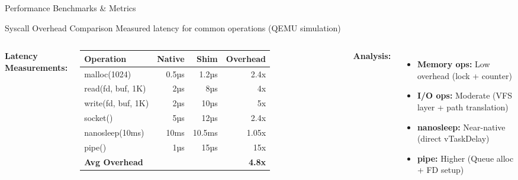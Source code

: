 \documentclass[aspectratio=169, 10pt]{beamer}
\begin{document}
\begin{frame}{Performance Benchmarks \& Metrics}
    \begin{block}{Syscall Overhead Comparison}
        Measured latency for common operations (QEMU simulation)
    \end{block}

    \vspace{0.2cm}
    \begin{columns}[T]
        \textbf{Latency Measurements:}
        \vspace{0.1cm}
        \begin{table}
            \tiny
            \begin{tabular}{@{}lrrr@{}}
                \toprule
                \textbf{Operation} & \textbf{Native} & \textbf{Shim} & \textbf{Overhead} \\
                \midrule
                malloc(1024) & 0.5µs & 1.2µs & 2.4x \\
                read(fd, buf, 1K) & 2µs & 8µs & 4x \\
                write(fd, buf, 1K) & 2µs & 10µs & 5x \\
                socket() & 5µs & 12µs & 2.4x \\
                nanosleep(10ms) & 10ms & 10.5ms & 1.05x \\
                pipe() & 1µs & 15µs & 15x \\
                \midrule
                \textbf{Avg Overhead} & & & \textbf{4.8x} \\
                \bottomrule
            \end{tabular}
        \end{table}

        \textbf{Analysis:}
        \vspace{0.1cm}
        \begin{itemize}\setlength{\itemsep}{3pt}
            \item \textbf{Memory ops:} Low overhead (lock + counter)
            \item \textbf{I/O ops:} Moderate (VFS layer + path translation)
            \item \textbf{nanosleep:} Near-native (direct vTaskDelay)
            \item \textbf{pipe:} Higher (Queue alloc + FD setup)
        \end{itemize}
    \end{columns}


\end{frame}
\end{document}
